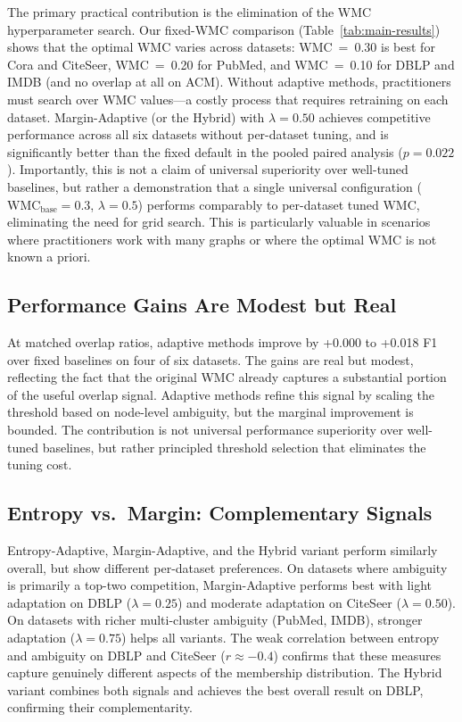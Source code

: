 \documentclass[a4paper,11pt,oneside,onecolumn,preprint]{elsarticle}
\numberwithin{equation}{section}
\begin{document}
The primary practical contribution is the elimination of the WMC hyperparameter search.
Our fixed-WMC comparison (Table~\ref{tab:main-results}) shows that the optimal WMC varies across datasets: WMC~=~0.30 is best for Cora and CiteSeer, WMC~=~0.20 for PubMed, and WMC~=~0.10 for DBLP and IMDB (and no overlap at all on ACM).
Without adaptive methods, practitioners must search over WMC values---a costly process that requires retraining on each dataset.
Margin-Adaptive (or the Hybrid) with $\lambda = 0.50$ achieves competitive performance across all six datasets without per-dataset tuning, and is significantly better than the fixed default in the pooled paired analysis ($p=0.022$).
Importantly, this is not a claim of universal superiority over well-tuned baselines, but rather a demonstration that a single universal configuration ($\mathrm{WMC}_{\mathrm{base}} = 0.3$, $\lambda = 0.5$) performs comparably to per-dataset tuned WMC, eliminating the need for grid search.
This is particularly valuable in scenarios where practitioners work with many graphs or where the optimal WMC is not known a priori.

\subsection{Performance Gains Are Modest but Real}

At matched overlap ratios, adaptive methods improve by +0.000 to +0.018 F1 over fixed baselines on four of six datasets.
The gains are real but modest, reflecting the fact that the original WMC already captures a substantial portion of the useful overlap signal.
Adaptive methods refine this signal by scaling the threshold based on node-level ambiguity, but the marginal improvement is bounded.
The contribution is not universal performance superiority over well-tuned baselines, but rather principled threshold selection that eliminates the tuning cost.

\subsection{Entropy vs.\ Margin: Complementary Signals}

Entropy-Adaptive, Margin-Adaptive, and the Hybrid variant perform similarly overall, but show different per-dataset preferences.
On datasets where ambiguity is primarily a top-two competition, Margin-Adaptive performs best with light adaptation on DBLP ($\lambda = 0.25$) and moderate adaptation on CiteSeer ($\lambda = 0.50$).
On datasets with richer multi-cluster ambiguity (PubMed, IMDB), stronger adaptation ($\lambda = 0.75$) helps all variants.
The weak correlation between entropy and ambiguity on DBLP and CiteSeer ($r \approx -0.4$) confirms that these measures capture genuinely different aspects of the membership distribution.
The Hybrid variant combines both signals and achieves the best overall result on DBLP, confirming their complementarity.
\end{document}
